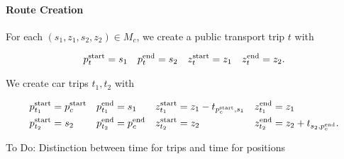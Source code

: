 \paragraph{Route Creation}

For each $\left(s_1,z_1,s_2,z_2\right)\in M_c$, we create a public transport trip $t$ with

\begin{align*}
	p^{\operatorname{start}}_t = s_1 && p^{\operatorname{end}}_t = s_2 && z^{\operatorname{start}}_t = z_1 && z^{\operatorname{end}}_t = z_2.
\end{align*}

We create car trips $t_1, t_2$ with

\begin{align*}
	p^{\operatorname{start}}_{t_1} & = p^{\operatorname{start}}_c & p^{\operatorname{end}}_{t_1} & = s_1 & z^{\operatorname{start}}_{t_1} & = z_1 - t_{p^{\operatorname{start}}_c,s_1} & z^{\operatorname{end}}_{t_1} & = z_1 \\
	p^{\operatorname{start}}_{t_2} & = s_2 & p^{\operatorname{end}}_{t_2} & = p^{\operatorname{end}}_c & z^{\operatorname{start}}_{t_2} & = z_2 & z^{\operatorname{end}}_{t_2} & = z_2 + t_{s_2,p^{\operatorname{end}}_c}.
\end{align*}

To Do:
Distinction between time for trips and time for positions